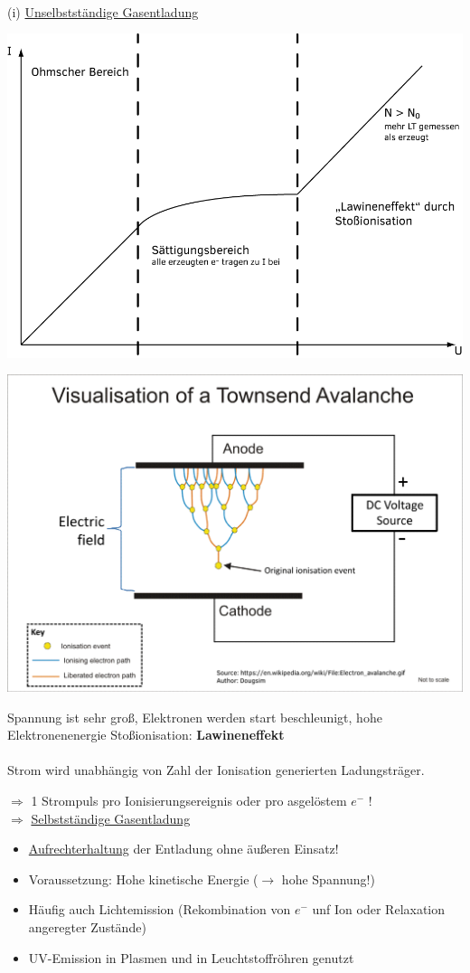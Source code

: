 \documentclass[11pt]{article}
\begin{document}
	\\
	(i) \underline{Unselbstständige Gasentladung} \\
	\begin{center}
		\includegraphics[width=0.8\linewidth]{skizzen/15/VL07/VL7_2}
	\end{center}
	\begin{center}
		\includegraphics[width=0.7\linewidth]{skizzen/15/VL07/7}\\
		\begin{flushleft}
			Spannung ist sehr groß, Elektronen werden start beschleunigt, hohe Elektronenenergie Stoßionisation: \textbf{Lawineneffekt}\\
			\hfill \\
			Strom wird unabhängig von Zahl der Ionisation generierten Ladungsträger. 
		\end{flushleft}
	\end{center}
	$ \Rightarrow $ 1 Strompuls pro Ionisierungsereignis oder pro asgelöstem $ e^- $ ! \\
	$ \Rightarrow $ \underline{Selbstständige Gasentladung}
	\begin{itemize}
		\item \underline{Aufrechterhaltung} der Entladung ohne äußeren Einsatz!
		\item Voraussetzung: Hohe kinetische Energie ($ \longrightarrow $ hohe Spannung!)
		\item Häufig auch Lichtemission (Rekombination von $ e^- $ unf Ion oder Relaxation angeregter Zustände)
		\item UV-Emission in Plasmen und in Leuchtstoffröhren genutzt
	\end{itemize}
\subsection{}
				
\end{document}
